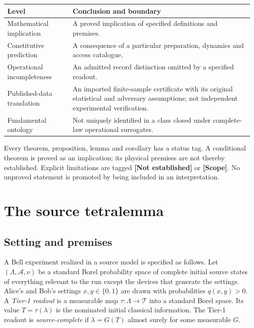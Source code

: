 \documentclass[11pt,a4paper]{article}
\theoremstyle{definition}
\theoremstyle{remark}\newtheorem{remark}[theorem]{Remark}
\begin{document}
\begin{center}\small
\begin{tabularx}{\textwidth}{@{}p{}X@{}}\toprule
Level & Conclusion and boundary\\\midrule
Mathematical implication & A proved implication of specified definitions and premises.\\
Constitutive prediction & A consequence of a particular preparation, dynamics and access catalogue.\\
Operational incompleteness & An admitted record distinction omitted by a specified readout.\\
Published-data translation & An imported finite-sample certificate with its original statistical and adversary assumptions; not independent experimental verification.\\
Fundamental ontology & Not uniquely identified in a class closed under complete-law operational surrogates.\\\bottomrule
\end{tabularx}
\end{center}
Every theorem, proposition, lemma and corollary has a status tag. A conditional theorem is proved as an implication; its physical premises are not thereby established. Explicit limitations are tagged \textbf{[Not established]} or \textbf{[Scope]}. No unproved statement is promoted by being included in an interpretation.

\section{The source tetralemma}\label{tet:section}
\subsection{Setting and premises}\label{tet:setting}
A Bell experiment realized in a source model is specified as follows. Let $(\Lambda,\mathcal A,\nu)$ be a standard Borel probability space of complete initial source states of everything relevant to the run except the devices that generate the settings. Alice's and Bob's settings $x,y\in\{0,1\}$ are drawn with probabilities $q(x,y)>0$. A \emph{Tier-1 readout} is a measurable map $\tau:\Lambda\to\mathcal T$ into a standard Borel space. Its value $T=\tau(\lambda)$ is the nominated initial classical information. The Tier-1 readout is \emph{source-complete} if $\lambda=G(T)$ almost surely for some measurable $G$.
\end{document}

